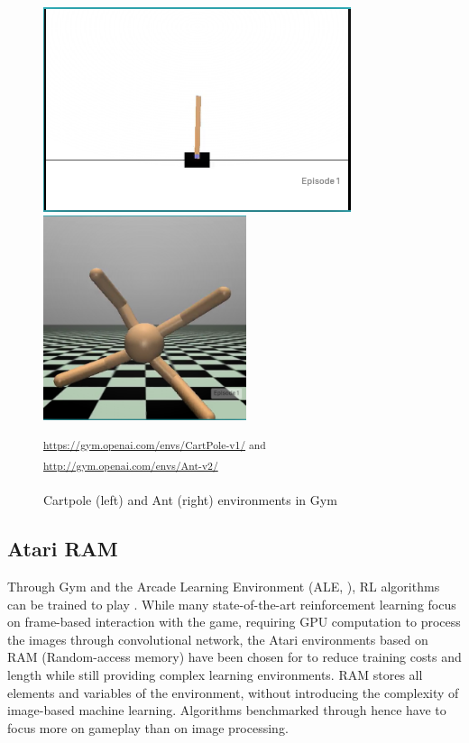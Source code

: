 \begin{figure}[H]
 \centering
 \captionsetup{justification=centering, margin=0.5cm}
\includegraphics[height=6cm]{images/cartpole.PNG}
\includegraphics[height=6cm]{images/ant.PNG}
\caption{Cartpole (left) and Ant (right) environments in Gym}
 \small\textsuperscript{\url{https://gym.openai.com/envs/CartPole-v1/} and  \url{http://gym.openai.com/envs/Ant-v2/}}
 \label{fig:gym}
\end{figure}

\subsection{Atari RAM}
Through Gym and the Arcade Learning Environment (ALE, \cite{Atari}), RL algorithms can be trained to play . While many state-of-the-art reinforcement learning focus on frame-based interaction with the game, requiring GPU computation to process the images through convolutional network, the Atari environments based on RAM (Random-access memory) have been chosen for \berl to reduce training costs and length while still providing complex learning environments. RAM stores all elements and variables of the environment, without introducing the complexity of image-based machine learning. Algorithms benchmarked through \berl hence have to focus more on gameplay than on image processing. 

